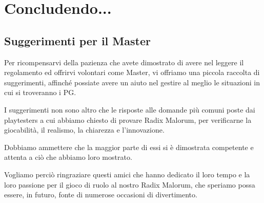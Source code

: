 \chapter{Concludendo...}

\newenvironment{faq}{\begin{description}}{\end{description}}
\newcommand{\Question}[1]{\medskip \bf\item{D:} #1\par}
\newcommand{\Answer}[1]{\it \item{R:} #1}

{\raggedright \section{Suggerimenti per il Master}}

Per ricompensarvi della pazienza che avete dimostrato di avere nel
leggere il regolamento ed offrirvi volontari come Master, vi
offriamo una piccola raccolta di suggerimenti, affinch\'e
possiate avere un aiuto nel gestire al meglio le situazioni in cui si
troveranno i PG.

I suggerimenti non sono altro che le risposte alle domande pi\`u
comuni poste dai playtesters a cui abbiamo chiesto di provare Radix
Malorum, per verificarne la giocabilit\`a, il realismo, la chiarezza
e l'innovazione.

Dobbiamo ammettere che la maggior parte di essi si \`e dimostrata
competente e attenta a ci\`o che abbiamo loro mostrato.

Vogliamo perci\`o ringraziare questi amici che hanno dedicato il loro
tempo e la loro passione per il gioco di ruolo al nostro Radix
Malorum, che speriamo possa essere, in futuro, fonte di numerose
occasioni di divertimento.

\vspace{1cm}

